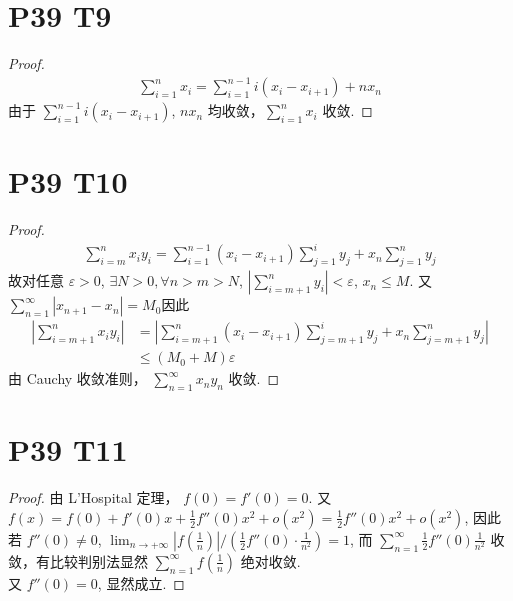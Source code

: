 \documentclass{article}
\newcommand{\sif}{\sum_{n = 1}^{\infty}}
\newcommand{\nti}{\lim_{n \to +\infty}}
\begin{document}
\section*{P39 T9}

\begin{proof}
    \begin{align*}
        \sum_{i = 1}^{n}x_i = \sum_{i = 1}^{n - 1}i(x_i - x_{i + 1}) + nx_n
    \end{align*}
    由于 $\sum_{i = 1}^{n - 1}i(x_i - x_{i + 1})$, $nx_n$ 均收敛，$\sum_{i = 1}^{n}x_i$ 收敛.
\end{proof}

\section*{P39 T10}

\begin{proof}
    \begin{align*}
        \sum_{i = m}^{n}x_iy_i = \sum_{i = 1}^{n - 1}(x_i - x_{i + 1})\sum_{j = 1}^{i}y_j + x_n\sum_{j = 1}^{n}y_j
    \end{align*}
    故对任意 $\varepsilon > 0$, $\exists N > 0, \forall n > m > N$, $\left\lvert \sum_{i = m + 1}^{n}y_i\right\rvert < \varepsilon$, $x_n \leqslant M$. 又 $\sif \left\lvert x_{n + 1} - x_n\right\rvert = M_0$因此
    \begin{align*}
        \left\lvert \sum_{i = m + 1}^{n}x_iy_i\right\rvert &= \left\lvert \sum_{i = m + 1}^{n}(x_i - x_{i + 1})\sum_{j = m + 1}^{i}y_j + x_n \sum_{j = m + 1}^{n}y_j \right\rvert \\
        &\leqslant (M_0 + M)\varepsilon
    \end{align*}
    由 Cauchy 收敛准则， $\sif x_ny_n$ 收敛.
\end{proof}

\section*{P39 T11}

\begin{proof}
    由 L'Hospital 定理， $f(0) = f'(0) = 0$. 又 $f(x) = f(0) + f'(0)x + \frac{1}{2}f''(0)x^2 + o(x^2) = \frac{1}{2}f''(0)x^2 + o(x^2)$, 因此若 $f''(0) \neq 0$, $\nti \left|f\left(\frac{1}{n}\right)\right| \bigg/ \left(\frac{1}{2}f''(0)\cdot\frac{1}{n^2}\right) = 1$, 而 $\sif \frac{1}{2}f''(0)\frac{1}{n^2}$ 收敛，有比较判别法显然 $\sif f\left(\frac{1}{n}\right)$ 绝对收敛. \\
    又 $f''(0) = 0$, 显然成立.        
\end{proof}
\end{document}
